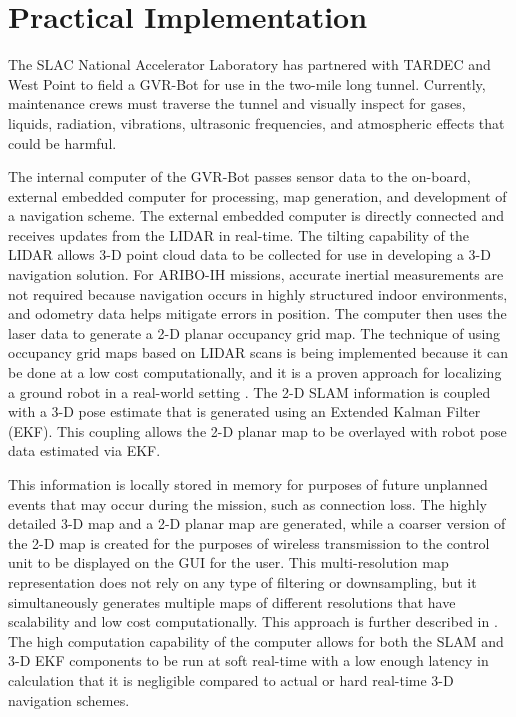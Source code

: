 \section{Practical Implementation}\label{sec:practical}

The SLAC National Accelerator Laboratory has partnered with TARDEC and West Point to field a GVR-Bot for use in the two-mile long tunnel. Currently, maintenance crews must traverse the tunnel and visually inspect for gases, liquids, radiation, vibrations, ultrasonic frequencies, and atmospheric effects that could be harmful.     

The internal computer of the GVR-Bot passes sensor data to the on-board, external embedded computer for processing, 
map generation, and development of a navigation scheme. The external embedded computer is directly connected and receives updates from the LIDAR in real-time. The tilting capability of the LIDAR allows 3-D point cloud data to be collected for use in developing a 3-D navigation solution. For ARIBO-IH missions, accurate inertial measurements are not required because navigation occurs in highly structured indoor environments, and odometry data helps mitigate errors in position. The computer then uses the laser data to generate a 2-D planar occupancy grid map. The technique of using occupancy grid maps based on LIDAR scans is being implemented because it can be done at a low cost computationally, and it is a proven approach for localizing a ground robot in a real-world setting \cite{thrun2005probabilistic,kohlbrecher2011flexible}. The 2-D SLAM information is coupled with a 3-D pose estimate that is generated using an Extended Kalman Filter (EKF). This coupling allows the 2-D planar map to be overlayed with robot pose data estimated via EKF. 

This information is locally stored in memory for purposes of future unplanned events that may occur during the mission, such as connection loss. The highly detailed 3-D map and a 2-D planar map are generated, while a coarser version of the 2-D map is created for the purposes of wireless transmission to the control unit to be displayed on the GUI for the user. This multi-resolution map representation does not rely on any type of filtering or downsampling, but it simultaneously generates multiple maps of different resolutions that have scalability and low cost computationally. This approach is further described in \cite{kohlbrecher2011flexible,habbecke2006iterative}. The high computation capability of the computer allows for both the SLAM and 3-D EKF components to be run at soft real-time with a low enough latency in calculation that it is negligible compared to actual or hard real-time 3-D navigation schemes.